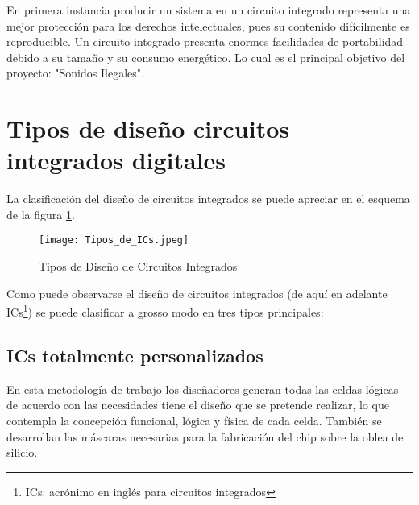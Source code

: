 En primera instancia producir un sistema en un circuito integrado representa una mejor protección para los derechos intelectuales, pues su contenido difícilmente es reproducible. Un circuito integrado presenta enormes facilidades de portabilidad debido a su tamaño y su consumo energético. Lo cual es el principal objetivo del proyecto: "Sonidos Ilegales".

%

\section{Tipos de diseño circuitos integrados digitales}

La clasificación del diseño de circuitos integrados se puede apreciar en el esquema de la figura \ref{ICs}.

\begin{figure}[h]
\texttt{[image: Tipos\_de\_ICs.jpeg]}
\centering
\caption{Tipos de Diseño de Circuitos Integrados}
\label{ICs}
\end{figure}
Como puede observarse el diseño de circuitos integrados (de aquí en adelante ICs\footnote{ICs: acrónimo en inglés para circuitos integrados}) se puede clasificar a grosso modo en tres tipos principales:

\subsection{\textbf{ICs totalmente personalizados}}

En esta metodología de trabajo los diseñadores generan todas las celdas lógicas de acuerdo con las necesidades tiene el diseño que se pretende realizar, lo que contempla la concepción funcional, lógica y física de cada celda. También se desarrollan las máscaras necesarias para la fabricación del chip sobre la oblea de silicio.

